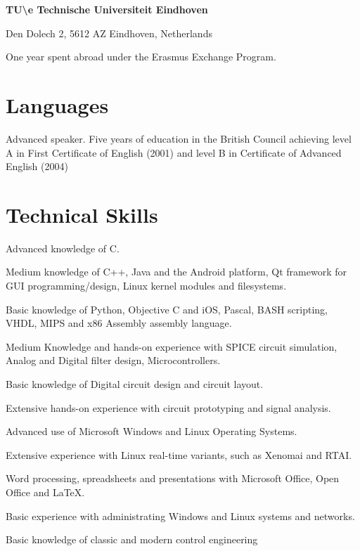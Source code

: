 \vspace{\baselineskip}

{
\textbf{TU\textbackslash e Technische Universiteit Eindhoven}

Den Dolech 2, 5612 AZ Eindhoven, Netherlands
}
{
One year spent abroad under the Erasmus Exchange Program.
}

\section*{Languages}

{
Advanced speaker. Five years of education in the British Council achieving
level A in First Certificate of English (2001) and level B in Certificate of
Advanced English (2004)
}


\section*{Technical Skills}

{
Advanced knowledge of C.
			
Medium knowledge of C++, Java and the Android platform, Qt framework for GUI
programming/design, Linux kernel modules and filesystems.
			
Basic knowledge of Python, Objective C and iOS, Pascal, BASH scripting, VHDL,
MIPS and x86 Assembly assembly language.
}
{
Medium Knowledge and hands-on experience with SPICE circuit simulation, Analog
and Digital filter design, Microcontrollers.
			 
Basic knowledge of Digital circuit design and circuit layout.

Extensive hands-on experience with circuit prototyping and signal analysis.
}
{
Advanced use of Microsoft Windows and Linux Operating Systems.

Extensive experience with Linux real-time variants, such as Xenomai and RTAI.

Word processing, spreadsheets and presentations with Microsoft Office, Open
Office and \LaTeX.

Basic experience with administrating Windows and Linux systems and networks.

Basic knowledge of classic and modern control engineering
}


